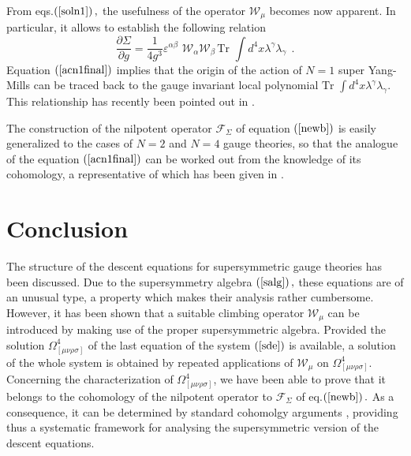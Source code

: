 \documentclass[a4paper,12pt]{article}
\begin{document}
From eqs.$\left( \ref{soln1}\right) ,$ the usefulness of the operator $%
\mathcal{W}_{\mu }$ becomes now apparent. In particular, it allows to
establish the following relation 
\begin{equation}
\frac{\partial \Sigma }{\partial g}=\frac{1}{4g^{3}}\varepsilon ^{\alpha
\beta }\,\,\mathcal{W}_{\alpha }\mathcal{W}_{\beta }\,\mathrm{Tr\,\,}\int
d^{4}x\lambda ^{\gamma }\lambda _{\gamma }\;\,.  \label{acn1final}
\end{equation}
Equation $\left( \ref{acn1final}\right) $ implies that the origin of the
action of $N=1$ super Yang-Mills can be traced back to the gauge invariant
local polynomial $\mathrm{Tr\,\,}\int d^{4}x\lambda ^{\gamma }\lambda
_{\gamma }.\;$This relationship has recently been pointed out in \cite{ul}.

The construction of the nilpotent operator $\mathcal{F}_{\Sigma }$ of
equation $\left( \ref{newb}\right) $ is easily generalized to the cases of $%
N=2$ and $N=4$ gauge theories, so that the analogue of the equation $\left( 
\ref{acn1final}\right) $ can be worked out from the knowledge of its
cohomology, a representative of which has been given in \cite{n2,n41}.

\section{Conclusion}

The structure of the descent equations for supersymmetric gauge theories has
been discussed. Due to the supersymmetry algebra $\left( \ref{salg}\right) ,$
these equations are of an unusual type, a property which makes their
analysis rather cumbersome. However, it has been shown that a suitable
climbing operator $\mathcal{W}_{\mu }$ can be introduced by making use of
the proper supersymmetric algebra. Provided the solution $\Omega _{[\mu \nu
\rho \sigma ]}^{4}$ of the last equation of the system $\left( \ref{sde}%
\right) $ is available, a solution of the whole system is obtained by
repeated applications of $\mathcal{W}_{\mu }$ on $\Omega _{[\mu \nu \rho
\sigma ]}^{4}$. Concerning the characterization of $\Omega _{[\mu \nu \rho
\sigma ]}^{4}$, we have been able to prove that it belongs to the cohomology
of the nilpotent operator to $\mathcal{F}_{\Sigma }$ of eq.$\left( \ref{newb}%
\right) .$ As a consequence, it can be determined by standard cohomolgy
arguments \cite{book,pr}, providing thus a systematic framework for
analysing the supersymmetric version of the descent equations.
\end{document}

